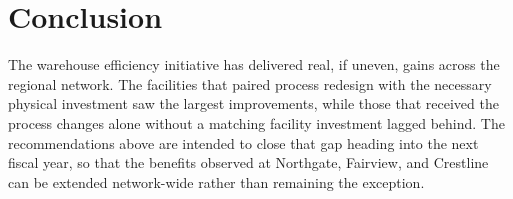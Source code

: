 \documentclass[11pt]{article}
\begin{document}
\section{Conclusion}
The warehouse efficiency initiative has delivered real, if uneven, gains
across the regional network. The facilities that paired process redesign
with the necessary physical investment saw the largest improvements, while
those that received the process changes alone without a matching facility
investment lagged behind. The recommendations above are intended to close
that gap heading into the next fiscal year, so that the benefits observed
at Northgate, Fairview, and Crestline can be extended network-wide rather
than remaining the exception.
\end{document}
